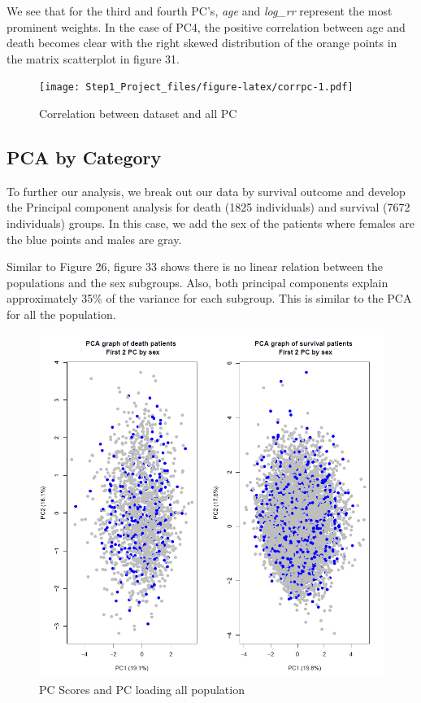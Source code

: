 \documentclass[
]{article}
\begin{document}
We see that for the third and fourth PC's, \emph{age} and \emph{log\_rr}
represent the most prominent weights. In the case of PC4, the positive
correlation between age and death becomes clear with the right skewed
distribution of the orange points in the matrix scatterplot in figure
31.

\begin{figure}
\centering
\texttt{[image: Step1\_Project\_files/figure-latex/corrpc-1.pdf]}
\caption{Correlation between dataset and all PC\label{fig:corrpc}}
\end{figure}

\newpage

\hypertarget{pca-by-category}{%
\subsection{PCA by Category}\label{pca-by-category}}

To further our analysis, we break out our data by survival outcome and
develop the Principal component analysis for death (1825 individuals)
and survival (7672 individuals) groups. In this case, we add the sex of
the patients where females are the blue points and males are gray.

Similar to Figure 26, figure 33 shows there is no linear relation
between the populations and the sex subgroups. Also, both principal
components explain approximately 35\% of the variance for each subgroup.
This is similar to the PCA for all the population.

\begin{figure}
\centering
\includegraphics{../figure_output/pca_groups.png}
\caption{PC Scores and PC loading all population}
\end{figure}
\end{document}
